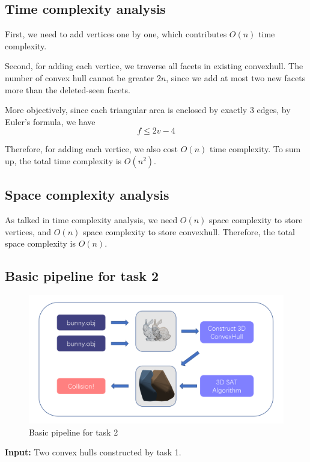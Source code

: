 \documentclass[acmtog]{acmart}
\begin{document}
\subsection*{Time complexity analysis}
	\quad First, we need to add vertices one by one, which contributes $O(n)$ time complexity. 
	
	\quad Second, for adding each vertice, we traverse all facets in existing convexhull. The number of convex hull cannot be greater $2n$, since we add at most two new facets more than the deleted-seen facets. 
	
	\quad More objectively, since each triangular area is enclosed by exactly 3 edges, by Euler's formula, we have 
	\[
	f\le 2v -4
	\]
		
	\quad Therefore, for adding each vertice, we also cost $O(n)$ time complexity. To sum up, the total time complexity is $O(n^2)$.
	
\subsection*{Space complexity analysis}
	\quad As talked in time complexity analysis, we need $O(n)$ space complexity to store vertices, and $O(n)$ space complexity to store convexhull. Therefore, the total space complexity is $O(n)$.
	
\subsection{Basic pipeline for task 2}

\begin{figure}[h]
	\centering
	\includegraphics[scale=0.15]{pipeline2.png}
	\caption{Basic pipeline for task 2}
	\label{fig:img3}
\end{figure}

\textbf{Input:} Two convex hulls constructed by task 1.
\end{document}

